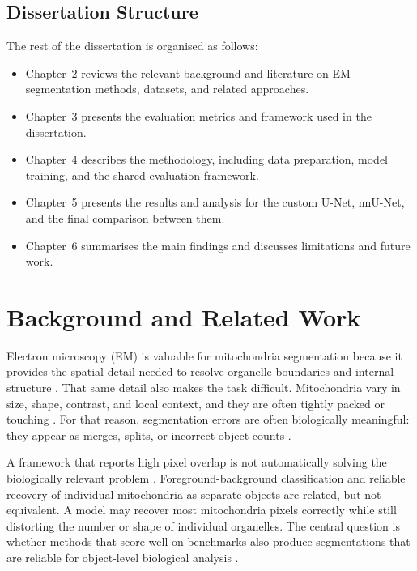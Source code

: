 \documentclass[logo,bsc,singlespacing,parskip,online]{infthesis}
\begin{document}
\section{Dissertation Structure}

The rest of the dissertation is organised as follows:

\begin{itemize}
\item Chapter~2 reviews the relevant background and literature on EM segmentation methods,
  datasets, and related approaches.

\item Chapter~3 presents the evaluation metrics and framework used in the
  dissertation.

\item Chapter~4 describes the methodology, including data preparation, model
  training, and the shared evaluation framework.

\item Chapter~5 presents the results and analysis for the custom U-Net,
  nnU-Net, and the final comparison between them.

\item Chapter~6 summarises the main findings and discusses limitations and
  future work.
\end{itemize}



\chapter{Background and Related Work}
Electron microscopy (EM) is valuable for mitochondria segmentation because it
provides the spatial detail needed to resolve organelle boundaries and internal
structure \citep{aswath2023segmentation, conrad2023instance}. That same detail
also makes the task
difficult. Mitochondria vary in
size, shape, contrast, and local context, and they are often tightly packed
or touching \citep{aswath2023segmentation, wei2020mitoem}. For
that reason, segmentation errors are often biologically meaningful: they
appear as merges, splits, or incorrect object counts
\citep{wei2020mitoem, franco-barranco2022stable, conrad2023instance}.

A framework that reports high pixel overlap is not automatically solving the
biologically relevant problem \citep{wei2020mitoem, conrad2023instance}.
Foreground-background classification and reliable recovery of individual
mitochondria as separate objects are related, but
not equivalent. A model may recover most mitochondria pixels correctly while
still distorting the number or shape of individual organelles. The central
question is whether methods that score well on benchmarks also produce
segmentations that are reliable for object-level biological analysis
\citep{wei2020mitoem, franco-barranco2022stable, conrad2023instance}.
\end{document}
